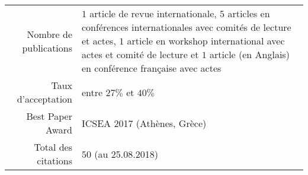 
\begin{tabular}{r @{~$\rangle$~} p{}}

Nombre de publications & $1$ article de revue internationale, $5$ articles en conférences internationales avec comités de lecture et actes, $1$ article en workshop international avec actes et comité de lecture et $1$ article (en Anglais) en conférence française avec actes\\
Taux d'acceptation & entre $27\%$ et $40\%$\\
Best Paper Award & ICSEA 2017 (Athènes, Grèce)\\
Total des citations & $50$ (au 25.08.2018)\\
\end{tabular}


